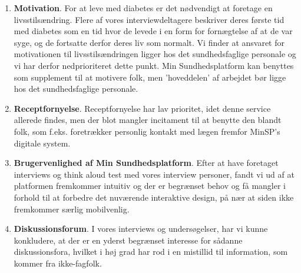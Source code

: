 \begin{enumerate}
	\item \textbf{Motivation}. For at leve med diabetes er det nødvendigt at foretage en livsstilsændring. Flere af vores interviewdeltagere beskriver deres første tid med diabetes som en tid hvor de levede i en form for fornægtelse af at de var syge, og de fortsatte derfor deres liv som normalt. Vi finder at ansvaret for motivationen til livsstilsændringen ligger hos det sundhedsfaglige personale og vi har derfor nedprioriteret dette punkt. Min Sundhedsplatform kan benyttes som supplement til at motivere folk, men 'hoveddelen' af arbejdet bør ligge hos det sundhedsfaglige personale.
	\item \textbf{Receptfornyelse}. Receptfornyelse har lav prioritet, idet denne service allerede findes, men der blot mangler incitament til at benytte den blandt folk, som f.eks. foretrækker personlig kontakt med lægen fremfor MinSP's digitale system.
	\item \textbf{Brugervenlighed af Min Sundhedsplatform}. Efter at have foretaget interviews og think aloud test med vores interview personer, fandt vi ud af at platformen fremkommer intuitiv og der er begrænset behov og få mangler i forhold til at forbedre det nuværende interaktive design, på nær at siden ikke fremkommer særlig mobilvenlig. 
	\item \textbf{Diskussionsforum}. I vores interviews og undersøgelser, har vi kunne konkludere, at der er en yderst begrænset interesse for sådanne diskussionsfora, hvilket i høj grad har rod i en mistillid til information, som kommer fra ikke-fagfolk.
\end{enumerate}
